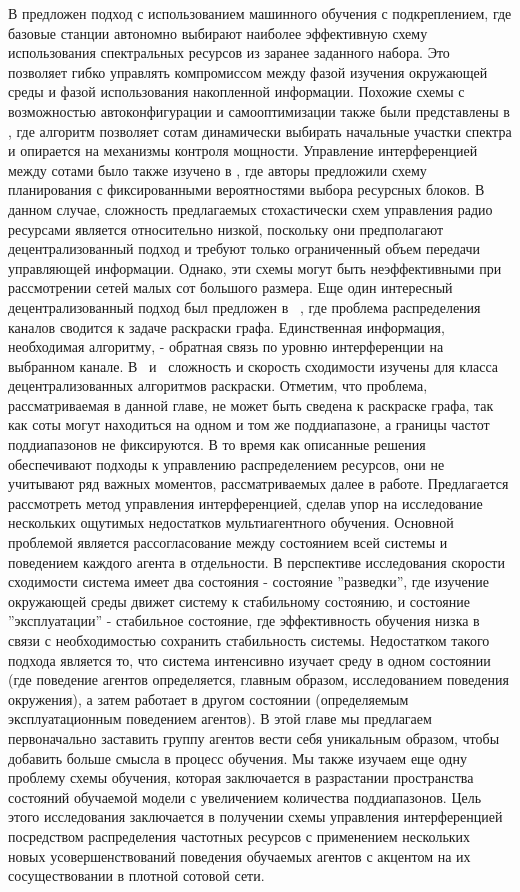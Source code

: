 В \cite{mab} предложен подход с использованием машинного обучения с подкреплением, где базовые станции автономно выбирают наиболее эффективную схему использования спектральных ресурсов из заранее заданного набора. Это позволяет гибко управлять компромиссом между фазой изучения окружающей среды и фазой использования накопленной информации. Похожие схемы с возможностью автоконфигурации и самооптимизации также были представлены в \cite{local-area}, где алгоритм позволяет сотам динамически выбирать начальные участки спектра и опирается на механизмы контроля мощности. Управление интерференцией между сотами было также изучено в \cite{on-uplink}, где авторы предложили схему планирования с фиксированными вероятностями выбора ресурсных блоков. В данном случае, сложность предлагаемых стохастически схем управления радио ресурсами является относительно низкой, поскольку они предполагают децентрализованный подход и требуют только ограниченный объем передачи управляющей информации. Однако, эти схемы могут быть неэффективными при рассмотрении сетей малых сот большого размера.
Еще один интересный децентрализованный подход был предложен в ~\cite{1666484}, где проблема распределения каналов сводится к задаче раскраски графа. Единственная информация, необходимая алгоритму, - обратная связь по уровню интерференции на выбранном канале. В~\cite{Duffy:2008:CAD:1377038.1377164} и ~\cite{4177619}сложность и скорость сходимости изучены для класса децентрализованных алгоритмов раскраски. Отметим, что проблема, рассматриваемая в данной главе, не может быть сведена к раскраске графа, так как соты могут находиться на одном и том же поддиапазоне, а границы частот поддиапазонов не фиксируются.
В то время как описанные решения обеспечивают подходы к управлению распределением ресурсов, они не учитывают ряд важных моментов, рассматриваемых далее в работе. Предлагается рассмотреть метод управления интерференцией, сделав упор на исследование нескольких ощутимых недостатков мультиагентного обучения. Основной проблемой является рассогласование между состоянием всей системы и поведением каждого агента в отдельности. В перспективе исследования скорости сходимости система имеет два состояния - состояние ''разведки'', где изучение окружающей среды движет систему к стабильному состоянию, и состояние ''эксплуатации'' - стабильное состояние, где эффективность обучения низка в связи с необходимостью сохранить стабильность системы. Недостатком такого подхода является то, что система интенсивно изучает среду в одном состоянии (где поведение агентов определяется, главным образом, исследованием поведения окружения), а затем работает в другом состоянии (определяемым эксплуатационным поведением агентов). В этой главе мы предлагаем первоначально заставить группу агентов вести себя уникальным образом, чтобы добавить больше смысла в процесс обучения. Мы также изучаем еще одну проблему схемы обучения, которая заключается в разрастании пространства состояний обучаемой модели с увеличением количества поддиапазонов.
Цель этого исследования заключается в получении схемы управления интерференцией посредством распределения частотных ресурсов с применением нескольких новых усовершенствований поведения обучаемых агентов с акцентом на их сосуществовании в плотной сотовой сети.


